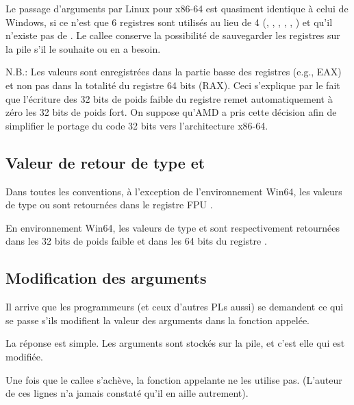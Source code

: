 Le passage d'arguments par Linux pour x86-64 est quasiment identique à celui de Windows, si ce n'est 
que 6 registres sont utilisés au lieu de 4 (\RDI, \RSI, \RDX, \RCX, , ) et qu'il n'existe
pas de . Le \gls{callee} conserve la possibilité de sauvegarder les registres sur la 
pile s'il le souhaite ou en a besoin.




N.B.: Les valeurs sont enregistrées dans la partie basse des registres (e.g., EAX) et non pas dans la 
totalité du registre 64 bits (RAX).
Ceci s'explique par le fait que l'écriture des 32 bits de poids faible du registre remet automatiquement 
à zéro les 32 bits de poids fort.
On suppose qu'AMD a pris cette décision afin de simplifier le portage du code 32 bits vers l'architecture 
x86-64.

\subsection{Valeur de retour de type \Tfloat et \Tdouble}

Dans toutes les conventions, à l'exception de l'environnement Win64, les valeurs de type \Tfloat ou 
\Tdouble sont retournées dans le registre FPU .

En environnement Win64, les valeurs de type \Tfloat et \Tdouble sont respectivement retournées dans 
les 32 bits de poids faible et dans les 64 bits du registre .

\subsection{Modification des arguments}

Il arrive que les programmeurs \CCpp{} (et ceux d'autres \ac{PL}s aussi) se demandent ce qui se passe 
s'ils modifient la valeur des arguments dans la fonction appelée.

La réponse est simple. Les arguments sont stockés sur la pile, et c'est elle qui est modifiée.

Une fois que le \gls{callee} s'achève, la fonction appelante ne les utilise pas.
(L'auteur de ces lignes n'a jamais constaté qu'il en aille autrement).



